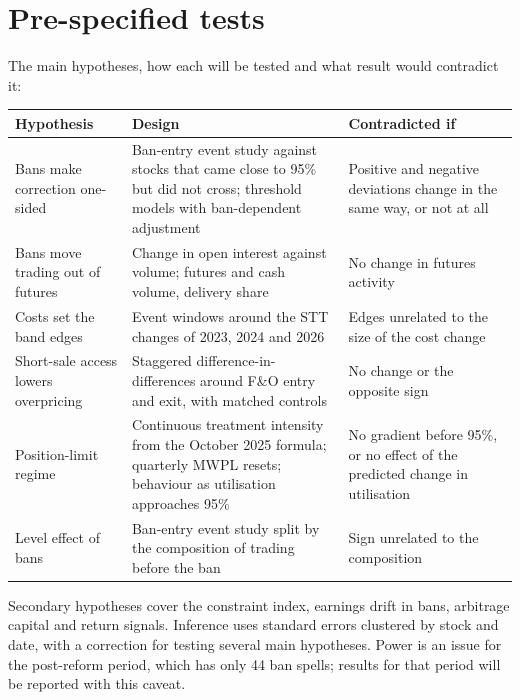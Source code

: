 \documentclass[11pt,a4paper]{article}
\begin{document}
\section{Pre-specified tests}\label{sec:tests}
The main hypotheses, how each will be tested and what result would contradict it:
\begin{center}\small
\begin{tabularx}{\textwidth}{>{\raggedright\arraybackslash}p{3.3cm}>{\raggedright\arraybackslash}X>{\raggedright\arraybackslash}X}
\toprule
Hypothesis & Design & Contradicted if \\
\midrule
Bans make correction one-sided & Ban-entry event study against stocks that came close to 95\% but did not cross; threshold
models with ban-dependent adjustment & Positive and negative deviations change in the same way, or not at all \\
Bans move trading out of futures & Change in open interest against volume; futures and cash volume, delivery share & No change in futures activity \\
Costs set the band edges & Event windows around the STT changes of 2023, 2024 and 2026 & Edges unrelated to the size of the cost change \\
Short-sale access lowers overpricing & Staggered difference-in-differences around F\&O entry and exit, with matched controls & No change or the opposite sign \\
Position-limit regime & Continuous treatment intensity from the October 2025 formula; quarterly MWPL resets; behaviour as utilisation approaches 95\% & No gradient before 95\%, or no effect of the predicted change in utilisation \\
Level effect of bans & Ban-entry event study split by the composition of trading before the ban & Sign unrelated to the composition \\
\bottomrule
\end{tabularx}
\end{center}
Secondary hypotheses cover the constraint index, earnings drift in bans, arbitrage capital and return signals. Inference uses
standard errors clustered by stock and date, with a correction for testing several main hypotheses. Power is an issue for the
post-reform period, which has only 44 ban spells; results for that period will be reported with this caveat.
\end{document}
